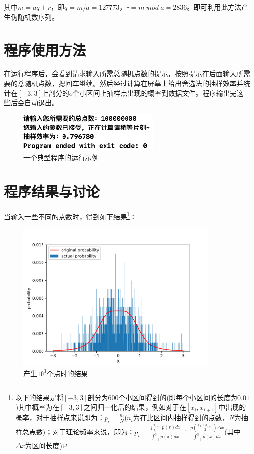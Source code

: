 \documentclass[a4paper,11pt]{article}
\begin{document}
其中$m=aq+r$，即$q=m/a=127773$，$r=m \ mod \ a=2836$。即可利用此方法产生伪随机数序列。



\section{程序使用方法}
在运行程序后，会看到请求输入所需总随机点数的提示，按照提示在后面输入所需要的总随机点数，摁回车继续。然后经过计算在屏幕上给出舍选法的抽样效率并统计在$[-3,3]$上剖分的$o$个小区间上抽样点出现的概率到数据文件。程序输出完这些后会自动退出。
\begin{figure}[!htbp]        
\centering
\includegraphics[width=7cm]{example.png}      
\caption{ 一个典型程序的运行示例}      
\end{figure}


\newpage
\section{程序结果与讨论}
当输入一些不同的点数时，得到如下结果\footnote{以下的结果是将$[-3,3]$剖分为600个小区间得到的(即每个小区间的长度为$0.01$)其中概率为在$[-3,3]$之间归一化后的结果，例如对于在$[x_{i},x_{i+1}]$中出现的概率，对于抽样点来说即为：$p_{i} = \frac{n_{i}}{N}$($n_{i}$为在此区间内抽样得到的点数，$N$为抽样总点数)；对于理论频率来说，即为：$p_{i} = \frac{ \int_{x_{i}}^{x_{i+1}}p(x)dx }{ \int_{-3}^{3}p(x)dx } \doteq \frac{ p(\frac{x_{2}+x_{i+1}}{2})\Delta x }{ \int_{-3}^{3}p(x)dx }$(其中$\Delta x$为区间长度)}：

\begin{figure}[!htbp]        
\centering
\includegraphics[width=10cm]{103.png}      
\caption{ 产生$10^{3}$个点时的结果}      
\end{figure}
\end{document}
